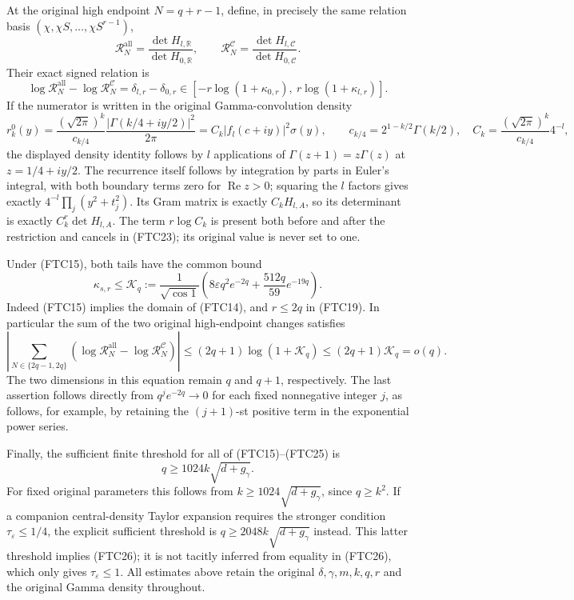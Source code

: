 \documentclass[11pt,a4paper]{article}
\begin{document}
At the original high endpoint $N=q+r-1$, define, in precisely the same
relation basis $(\chi,\chi S,\ldots,\chi S^{r-1})$,
\[
 \mathcal R_{N}^{\mathrm{all}}=
 \frac{\det H_{l,\mathbb R}}{\det H_{0,\mathbb R}},\qquad
 \mathcal R_N^{\mathcal C}=
 \frac{\det H_{l,\mathcal C}}{\det H_{0,\mathcal C}}.
\]
Their exact signed relation is
\begin{equation}
 \log\mathcal R_N^{\mathrm{all}}-\log\mathcal R_N^{\mathcal C}
 =\delta_{l,r}-\delta_{0,r}
 \in[-r\log(1+\kappa_{0,r}),\ r\log(1+\kappa_{l,r})].
 \tag{FTC23}
\end{equation}
If the numerator is written in the original Gamma-convolution density
\[
 r_k^0(y)=\frac{(\sqrt{2\pi})^k}{c_{k/4}}
 \frac{|\Gamma(k/4+iy/2)|^2}{2\pi}
 =C_k|f_l(c+iy)|^2\sigma(y),\qquad
 c_{k/4}=2^{1-k/2}\Gamma(k/2),\quad
 C_k=\frac{(\sqrt{2\pi})^k}{c_{k/4}}4^{-l},
\]
the displayed density identity follows by $l$ applications of
$\Gamma(z+1)=z\Gamma(z)$ at $z=1/4+iy/2$.
The recurrence itself follows by integration by parts in Euler's integral,
with both boundary terms zero for $\operatorname{Re}z>0$; squaring the
$l$ factors gives exactly $4^{-l}\prod_j(y^2+t_j^2)$.
Its Gram matrix is exactly $C_kH_{l,A}$,
so its determinant is exactly $C_k^r\det H_{l,A}$.  The term
$r\log C_k$ is present both before and after the restriction and cancels
in (FTC23); its original value is never set to one.

Under (FTC15), both tails have the common bound
\begin{equation}
 \kappa_{s,r}\le\mathcal K_q:=
 \frac1{\sqrt{\cos1}}
 \left(8\varepsilon q^2e^{-2q}+\frac{512q}{59}e^{-19q}\right).
 \tag{FTC24}
\end{equation}
Indeed (FTC15) implies the domain of (FTC14), and $r\le2q$ in (FTC19).
In particular the sum of the two original high-endpoint changes satisfies
\begin{equation}
 \left|\sum_{N\in\{2q-1,2q\}}
 \left(\log\mathcal R_N^{\mathrm{all}}-
 \log\mathcal R_N^{\mathcal C}\right)\right|
 \le(2q+1)\log(1+\mathcal K_q)
 \le(2q+1)\mathcal K_q=o(q).
 \tag{FTC25}
\end{equation}
The two dimensions in this equation remain $q$ and $q+1$, respectively.
The last assertion follows directly from $q^j e^{-2q}\to0$ for each
fixed nonnegative integer $j$, as follows, for example, by retaining
the $(j+1)$-st positive term in the exponential power series.

Finally, the sufficient finite threshold for all of (FTC15)--(FTC25) is
\begin{equation}
 q\ge1024k\sqrt{d+g_\gamma}.
 \tag{FTC26}
\end{equation}
For fixed original parameters this follows from
$k\ge1024\sqrt{d+g_\gamma}$, since $q\ge k^2$.
If a companion central-density Taylor expansion requires the stronger
condition $\tau_\varepsilon\le1/4$, the explicit sufficient threshold is
$q\ge2048k\sqrt{d+g_\gamma}$ instead.  This latter threshold implies
(FTC26); it is not tacitly inferred from equality in (FTC26), which only
gives $\tau_\varepsilon\le1$.  All estimates above retain the original
$\delta,\gamma,m,k,q,r$ and the original Gamma density throughout.
\end{document}

